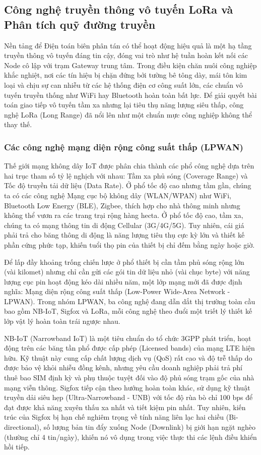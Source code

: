 \subsection{Công nghệ truyền thông vô tuyến LoRa và Phân tích quỹ đường truyền}
Nền tảng để Điện toán biên phân tán có thể hoạt động hiệu quả là một hạ tầng truyền thông vô tuyến đáng tin cậy, đóng vai trò như hệ tuần hoàn kết nối các Node cô lập với trạm Gateway trung tâm. Trong điều kiện chăn nuôi công nghiệp khắc nghiệt, nơi các tín hiệu bị chặn đứng bởi tường bê tông dày, mái tôn kim loại và chịu sự can nhiễu từ các hệ thống điện cơ công suất lớn, các chuẩn vô tuyến truyền thống như WiFi hay Bluetooth hoàn toàn bất lực. Để giải quyết bài toán giao tiếp vô tuyến tầm xa nhưng lại tiêu thụ năng lượng siêu thấp, công nghệ LoRa (Long Range) đã nổi lên như một chuẩn mực công nghiệp không thể thay thế.
\subsubsection{Các công nghệ mạng diện rộng công suất thấp (LPWAN)}
Thế giới mạng không dây IoT được phân chia thành các phổ công nghệ dựa trên hai trục tham số tỷ lệ nghịch với nhau: Tầm xa phủ sóng (Coverage Range) và Tốc độ truyền tải dữ liệu (Data Rate). Ở phổ tốc độ cao nhưng tầm gần, chúng ta có các công nghệ Mạng cục bộ không dây (WLAN/WPAN) như WiFi, Bluetooth Low Energy (BLE), Zigbee, thích hợp cho nhà thông minh nhưng không thể vươn ra các trang trại rộng hàng hecta. Ở phổ tốc độ cao, tầm xa, chúng ta có mạng thông tin di động Cellular (3G/4G/5G). Tuy nhiên, cái giá phải trả cho băng thông di động là năng lượng tiêu thụ cực kỳ lớn và thiết kế phần cứng phức tạp, khiến tuổi thọ pin của thiết bị chỉ đếm bằng ngày hoặc giờ.

Để lấp đầy khoảng trống chiến lược ở phổ thiết bị cần tầm phủ sóng rộng lớn (vài kilomet) nhưng chỉ cần gửi các gói tin dữ liệu nhỏ (vài chục byte) với năng lượng cục pin hoạt động kéo dài nhiều năm, một lớp mạng mới đã được định nghĩa: Mạng diện rộng công suất thấp (Low-Power Wide-Area Network - LPWAN). Trong nhóm LPWAN, ba công nghệ đang dẫn dắt thị trường toàn cầu bao gồm NB-IoT, Sigfox và LoRa, mỗi công nghệ theo đuổi một triết lý thiết kế lớp vật lý hoàn toàn trái ngược nhau.

NB-IoT (Narrowband IoT) là một tiêu chuẩn do tổ chức 3GPP phát triển, hoạt động trên các băng tần phổ được cấp phép (Licensed bands) của mạng LTE hiện hữu. Kỹ thuật này cung cấp chất lượng dịch vụ (QoS) rất cao và độ trễ thấp do được bảo vệ khỏi nhiễu đồng kênh, nhưng yêu cầu doanh nghiệp phải trả phí thuê bao SIM định kỳ và phụ thuộc tuyệt đối vào độ phủ sóng trạm gốc của nhà mạng viễn thông. Sigfox tiếp cận theo hướng hoàn toàn khác, sử dụng kỹ thuật truyền dải siêu hẹp (Ultra-Narrowband - UNB) với tốc độ rùa bò chỉ 100 bps để đạt được khả năng xuyên thấu xa nhất và tiết kiệm pin nhất. Tuy nhiên, kiến trúc của Sigfox bị hạn chế nghiêm trọng về tính năng liên lạc hai chiều (Bi-directional), số lượng bản tin đẩy xuống Node (Downlink) bị giới hạn ngặt nghèo (thường chỉ 4 tin/ngày), khiến nó vô dụng trong việc thực thi các lệnh điều khiển hồi tiếp.

